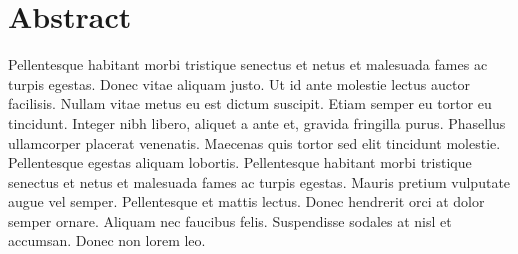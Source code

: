\chapter*{Abstract}
Pellentesque habitant morbi tristique senectus et netus et malesuada fames ac turpis egestas. Donec vitae aliquam justo. Ut id ante molestie lectus auctor facilisis. Nullam vitae metus eu est dictum suscipit. Etiam semper eu tortor eu tincidunt. Integer nibh libero, aliquet a ante et, gravida fringilla purus. Phasellus ullamcorper placerat venenatis. Maecenas quis tortor sed elit tincidunt molestie. Pellentesque egestas aliquam lobortis. Pellentesque habitant morbi tristique senectus et netus et malesuada fames ac turpis egestas. Mauris pretium vulputate augue vel semper. Pellentesque et mattis lectus. Donec hendrerit orci at dolor semper ornare. Aliquam nec faucibus felis. Suspendisse sodales at nisl et accumsan. Donec non lorem leo. 